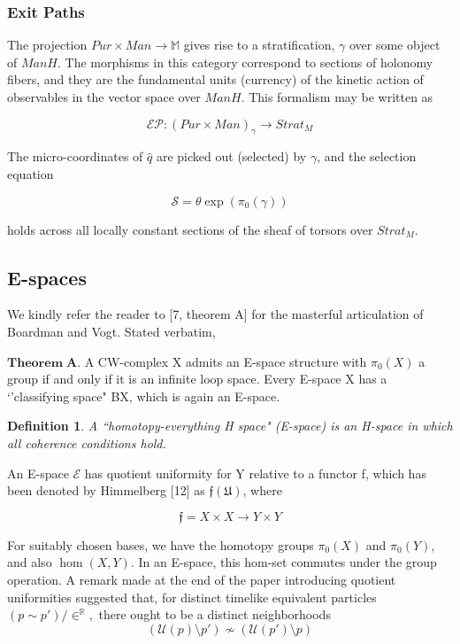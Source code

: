 \documentclass{article}
\newtheorem{dn}{Definition}
\begin{document}
		\subsubsection{Exit Paths}
		The projection $Pur \times Man \longrightarrow \mathbb{M}$ gives rise to a stratification, $\gamma$ over some object of $ManH$. The morphisms in this category correspond to sections of holonomy fibers, and they are the fundamental units (currency) of the kinetic action of observables in the vector space over $ManH$. This formalism may be written as
		
		$$\mathcal{EP}:(Pur \times Man)_\gamma \longrightarrow Strat_M$$
		
		The micro-coordinates of $\hat{q}$ are picked out (selected) by $\gamma$, and the selection equation
		
		$$\mathcal{S} = \theta\exp(\pi_0(\gamma))$$
		
		holds across all locally constant sections of the sheaf of torsors over $Strat_M$.
		
		\subsection{E-spaces}
		We kindly refer the reader to [7, theorem A] for the masterful articulation of Boardman and Vogt. Stated verbatim,
		
		$\mathbf{Theorem \; A}$. A CW-complex X admits an E-space structure with $\pi_0(X)$ a group if and only if it is an infinite loop space. Every E-space X has a `'classifying space" BX, which is again an E-space.
		
		\begin{dn}
			A ``homotopy-everything H space" (E-space) is an H-space in which all coherence conditions hold.
		\end{dn}
		
		An E-space $\mathcal{E}$ has quotient uniformity for Y relative to a functor f, which has been denoted by Himmelberg [12] as $\mathfrak{f}(\mathfrak{U})$, where
		
		$$\mathfrak{f} = X \times X \to Y \times Y$$
		
		For suitably chosen bases, we have the homotopy groups $\pi_0(X)$ and $\pi_0(Y)$, and also $\hom(X,Y)$. In an E-space, this hom-set commutes under the group operation. A remark made at the end of the paper introducing quotient uniformities suggested that, for distinct timelike equivalent particles $(p \sim p')/\in^\mathbb{R},$ there ought to be a distinct neighborhoods
		$$(\mathcal{U}(p) \setminus p') {\nsim} (\mathcal{U}(p') \setminus p)$$
		
\end{document}
